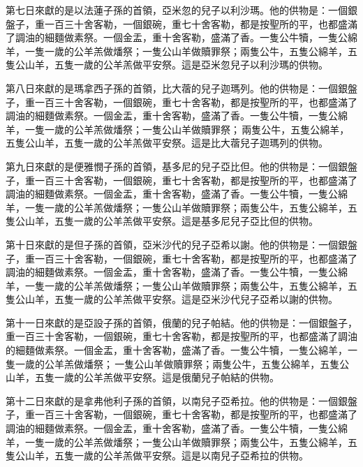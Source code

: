第七日來獻的是以法蓮子孫的首領，亞米忽的兒子以利沙瑪。他的供物是：一個銀盤子，重一百三十舍客勒，一個銀碗，重七十舍客勒，都是按聖所的平，也都盛滿了調油的細麵做素祭。一個金盂，重十舍客勒，盛滿了香。一隻公牛犢，一隻公綿羊，一隻一歲的公羊羔做燔祭；一隻公山羊做贖罪祭；兩隻公牛，五隻公綿羊，五隻公山羊，五隻一歲的公羊羔做平安祭。這是亞米忽兒子以利沙瑪的供物。

第八日來獻的是瑪拿西子孫的首領，比大蓿的兒子迦瑪列。他的供物是：一個銀盤子，重一百三十舍客勒，一個銀碗，重七十舍客勒，都是按聖所的平，也都盛滿了調油的細麵做素祭。一個金盂，重十舍客勒，盛滿了香。一隻公牛犢，一隻公綿羊，一隻一歲的公羊羔做燔祭；一隻公山羊做贖罪祭； 兩隻公牛，五隻公綿羊，五隻公山羊，五隻一歲的公羊羔做平安祭。這是比大蓿兒子迦瑪列的供物。

第九日來獻的是便雅憫子孫的首領，基多尼的兒子亞比但。他的供物是：一個銀盤子，重一百三十舍客勒，一個銀碗，重七十舍客勒，都是按聖所的平，也都盛滿了調油的細麵做素祭。一個金盂，重十舍客勒，盛滿了香。一隻公牛犢，一隻公綿羊，一隻一歲的公羊羔做燔祭；一隻公山羊做贖罪祭；兩隻公牛，五隻公綿羊，五隻公山羊，五隻一歲的公羊羔做平安祭。這是基多尼兒子亞比但的供物。

第十日來獻的是但子孫的首領，亞米沙代的兒子亞希以謝。他的供物是：一個銀盤子，重一百三十舍客勒，一個銀碗，重七十舍客勒，都是按聖所的平，也都盛滿了調油的細麵做素祭。一個金盂，重十舍客勒，盛滿了香。一隻公牛犢，一隻公綿羊，一隻一歲的公羊羔做燔祭；一隻公山羊做贖罪祭；兩隻公牛，五隻公綿羊，五隻公山羊，五隻一歲的公羊羔做平安祭。這是亞米沙代兒子亞希以謝的供物。

第十一日來獻的是亞設子孫的首領，俄蘭的兒子帕結。他的供物是：一個銀盤子，重一百三十舍客勒，一個銀碗，重七十舍客勒，都是按聖所的平，也都盛滿了調油的細麵做素祭。一個金盂，重十舍客勒，盛滿了香。一隻公牛犢，一隻公綿羊，一隻一歲的公羊羔做燔祭； 一隻公山羊做贖罪祭；兩隻公牛，五隻公綿羊，五隻公山羊，五隻一歲的公羊羔做平安祭。這是俄蘭兒子帕結的供物。

第十二日來獻的是拿弗他利子孫的首領，以南兒子亞希拉。他的供物是：一個銀盤子，重一百三十舍客勒，一個銀碗，重七十舍客勒，都是按聖所的平，也都盛滿了調油的細麵做素祭。一個金盂，重十舍客勒，盛滿了香。一隻公牛犢，一隻公綿羊，一隻一歲的公羊羔做燔祭；一隻公山羊做贖罪祭；兩隻公牛，五隻公綿羊，五隻公山羊，五隻一歲的公羊羔做平安祭。這是以南兒子亞希拉的供物。

